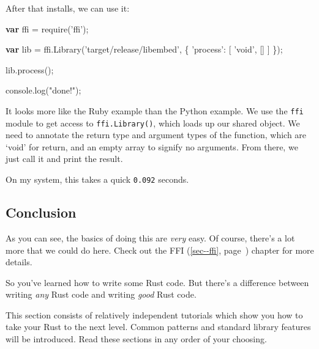 \documentclass[a4paper,]{book}
\renewcommand*{\hyperref}[2][\ar]{%
  \def\ar{#2}%
  #2 (\autoref{#1}, page~\pageref{#1})}
\newenvironment{Shaded}{\begin{snugshade}}{\end{snugshade}}
\newcommand{\KeywordTok}[1]{\textcolor[rgb]{0.13,0.29,0.53}{\textbf{{#1}}}}
\newcommand{\StringTok}[1]{\textcolor[rgb]{0.31,0.60,0.02}{{#1}}}
\newcommand{\OtherTok}[1]{\textcolor[rgb]{0.56,0.35,0.01}{{#1}}}
\newcommand{\FunctionTok}[1]{\textcolor[rgb]{0.00,0.00,0.00}{{#1}}}
\newcommand{\NormalTok}[1]{{#1}}
\begin{document}
After that installs, we can use it:

\begin{Shaded}
\begin{Highlighting}[]
\KeywordTok{var} \NormalTok{ffi = }\FunctionTok{require}\NormalTok{(}\StringTok{'ffi'}\NormalTok{);}

\KeywordTok{var} \NormalTok{lib = }\OtherTok{ffi}\NormalTok{.}\FunctionTok{Library}\NormalTok{(}\StringTok{'target/release/libembed'}\NormalTok{, \{}
  \StringTok{'process'}\NormalTok{: [ }\StringTok{'void'}\NormalTok{, []  ]}
\NormalTok{\});}

\OtherTok{lib}\NormalTok{.}\FunctionTok{process}\NormalTok{();}

\OtherTok{console}\NormalTok{.}\FunctionTok{log}\NormalTok{(}\StringTok{"done!"}\NormalTok{);}
\end{Highlighting}
\end{Shaded}

It looks more like the Ruby example than the Python example. We use the
\texttt{ffi} module to get access to \texttt{ffi.Library()}, which loads
up our shared object. We need to annotate the return type and argument
types of the function, which are `void' for return, and an empty array
to signify no arguments. From there, we just call it and print the
result.

On my system, this takes a quick \texttt{0.092} seconds.

\subsection{Conclusion}\label{conclusion}

As you can see, the basics of doing this are \emph{very} easy. Of
course, there's a lot more that we could do here. Check out the
\hyperref[sec--ffi]{FFI} chapter for more details.


So you've learned how to write some Rust code. But there's a difference
between writing \emph{any} Rust code and writing \emph{good} Rust code.

This section consists of relatively independent tutorials which show you
how to take your Rust to the next level. Common patterns and standard
library features will be introduced. Read these sections in any order of
your choosing.
\end{document}
